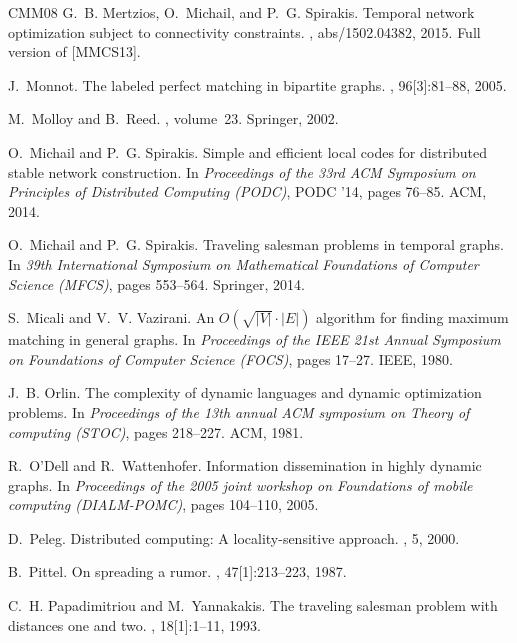 \documentclass[oribibl, 11pt]{llncs}
\begin{document}
\begin{thebibliography}{CMM{\etalchar{+}}08}
G.~B. Mertzios, O.~Michail, and P.~G. Spirakis.
\newblock Temporal network optimization subject to connectivity constraints.
, abs/1502.04382, 2015.
\newblock Full version of [MMCS13].

J.~Monnot.
\newblock The labeled perfect matching in bipartite graphs.
, 96[3]:81--88, 2005.

M.~Molloy and B.~Reed.
, volume~23.
\newblock Springer, 2002.

O.~Michail and P.~G. Spirakis.
\newblock Simple and efficient local codes for distributed stable network
  construction.
\newblock In {\em Proceedings of the 33rd ACM Symposium on Principles of
  Distributed Computing (PODC)}, PODC '14, pages 76--85. ACM, 2014.

O.~Michail and P.~G. Spirakis.
\newblock Traveling salesman problems in temporal graphs.
\newblock In {\em 39th International Symposium on Mathematical Foundations of
  Computer Science (MFCS)}, pages 553--564. Springer, 2014.

S.~Micali and V.~V. Vazirani.
\newblock An ${O}(\sqrt{|{V}|}\cdot |{E}|)$ algorithm for finding maximum
  matching in general graphs.
\newblock In {\em Proceedings of the IEEE 21st Annual Symposium on Foundations
  of Computer Science (FOCS)}, pages 17--27. IEEE, 1980.

J.~B. Orlin.
\newblock The complexity of dynamic languages and dynamic optimization
  problems.
\newblock In {\em Proceedings of the 13th annual ACM symposium on Theory of
  computing (STOC)}, pages 218--227. ACM, 1981.

R.~O'Dell and R.~Wattenhofer.
\newblock Information dissemination in highly dynamic graphs.
\newblock In {\em Proceedings of the 2005 joint workshop on Foundations of
  mobile computing (DIALM-POMC)}, pages 104--110, 2005.

D.~Peleg.
\newblock Distributed computing: A locality-sensitive approach.
, 5,
  2000.

B.~Pittel.
\newblock On spreading a rumor.
, 47[1]:213--223, 1987.

C.~H. Papadimitriou and M.~Yannakakis.
\newblock The traveling salesman problem with distances one and two.
, 18[1]:1--11, 1993.


\end{thebibliography}
\end{document}
